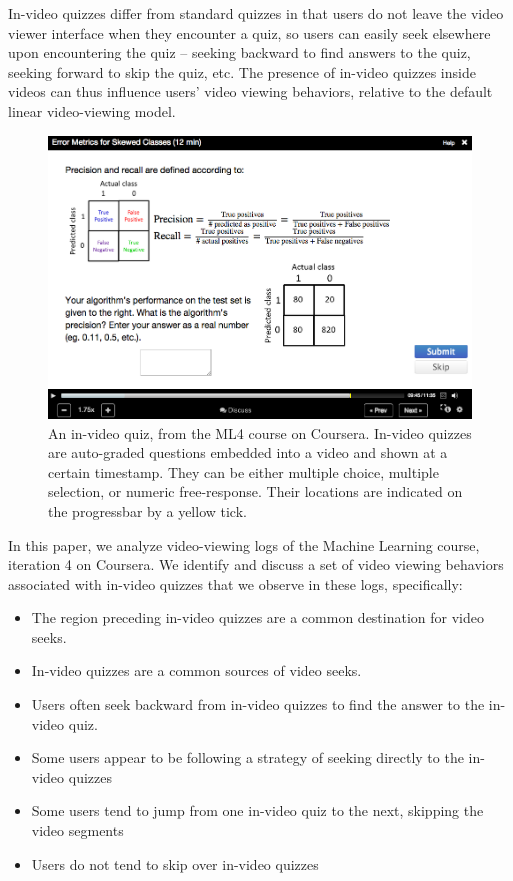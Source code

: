 \documentclass[letterpaper]{article}
\begin{document}
In-video quizzes differ from standard quizzes in that users do not leave the video viewer interface when they encounter a quiz, so users can easily seek elsewhere upon encountering the quiz -- seeking backward to find answers to the quiz, seeking forward to skip the quiz, etc.
The presence of in-video quizzes inside videos can thus influence users' video viewing behaviors,
relative to the default linear video-viewing model.

\begin{figure}
\includegraphics[width=1.0\columnwidth]{coursera}
\caption{An in-video quiz, from the ML4 course on Coursera. In-video quizzes are auto-graded questions embedded into a video and shown at a certain timestamp. They can be either multiple choice, multiple selection, or numeric free-response. Their locations are indicated on the progressbar by a yellow tick.}
\label{fig:coursera}
\end{figure}

In this paper, we analyze video-viewing logs of the Machine Learning course, iteration 4 on Coursera. We identify and discuss a set of video viewing behaviors associated with in-video quizzes that we observe in these logs, specifically:

\begin{itemize}
\item The region preceding in-video quizzes are a common destination for video seeks.
\item In-video quizzes are a common sources of video seeks.
\item Users often seek backward from in-video quizzes to find the answer to the in-video quiz.
\item Some users appear to be following a strategy of seeking directly to the in-video quizzes
\item Some users tend to jump from one in-video quiz to the next, skipping the video segments
\item Users do not tend to skip over in-video quizzes
\end{itemize}
\end{document}
